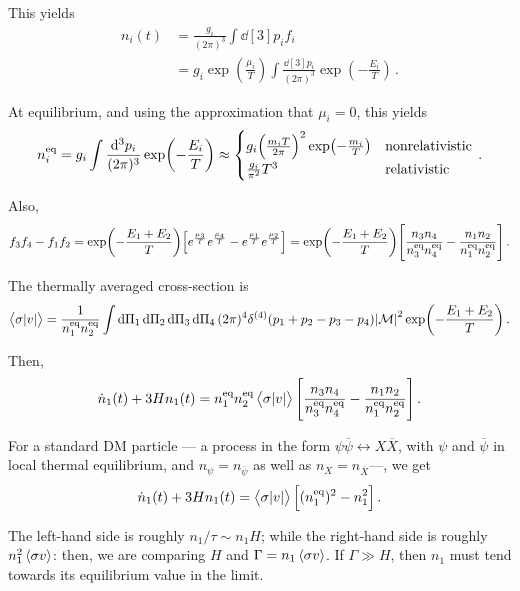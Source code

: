 \documentclass[main.tex]{subfiles}
\begin{document}
This yields 
%
\begin{align}
n_i (t) &= \frac{g_i}{(2 \pi )^3} \int \dd[3]{p_i} f_i  \\
&= g_i \exp( \frac{\mu_i}{T}) \int \frac{ \dd[3]{p_i}}{(2 \pi )^3} 
\exp(- \frac{E_i}{T})
\,.
\end{align}

At equilibrium, and using the approximation that \(\mu _i = 0\), this yields 
%
\begin{align} \label{eq:equilibrium-number-density}
n^{\text{eq}}_i = 
g_i \int \frac{ \dd[3]{p_i}}{(2 \pi )^3} 
\exp(- \frac{E_i}{T}) \approx \begin{cases}
    g_i \qty(\frac{m_i T}{2 \pi })^{2} \exp(- \frac{m_i}{T}) & \text{nonrelativistic}  \\
    \frac{g_i}{\pi^2} T^3 & \text{relativistic}
\end{cases}
\,.
\end{align}

Also, 
%
\begin{align}
f_3 f_4 - f_1 f_2 = \exp(- \frac{E_1 + E_2 }{T}) 
\qty[ e^{ \frac{\mu_3}{T}} e^{ \frac{\mu_4}{T}} - e^{ \frac{\mu_1}{T}} e^{ \frac{\mu_2}{T}} ] 
= \exp(- \frac{E_1 + E_2 }{T}) \qty[
    \frac{n_3 n_4 }{n_3^{\text{eq}} n_4^{\text{eq}}} -
    \frac{n_1 n_2 }{n_1^{\text{eq}} n_2^{\text{eq}}}
]
\,.
\end{align}

The thermally averaged cross-section is 
%
\begin{align}
\expval{\sigma \abs{v}} = 
\frac{1}{n_1^{\text{eq}} n_2^{\text{eq}}}
\int \dd{\Pi_1 }\dd{\Pi_2}\dd{\Pi_3 }\dd{\Pi_4 }
(2 \pi )^{4} \delta^{(4)} (p_1 + p_2 - p_3 - p_4 )
\abs{\mathcal{M}}^2 \exp(- \frac{E_1 + E_2 }{T})
\,.
\end{align}

Then, 
%
\begin{align}
\dot{n}_1(t) + 3 H n_1 (t) = n_1^{\text{eq}} n_2^{\text{eq}}
\expval{\sigma \abs{v}}
\qty[
    \frac{n_3 n_4 }{n_3^{\text{eq}} n_4^{\text{eq}}} -
    \frac{n_1 n_2 }{n_1^{\text{eq}} n_2^{\text{eq}}}
]
\,.
\end{align}

For a standard DM particle --- a process in the form \(\psi \overline{\psi} \leftrightarrow X \overline{X}\), with \(\psi \) and \(\overline{\psi }\) in local thermal equilibrium, and \(n_\psi = n_{\overline{\psi}}\) as well as \(n_X = n_{\overline{X}}\)---, we get 
%
\begin{align}
\dot{n}_1 (t) + 3 H n_1 (t) = \expval{\sigma \abs{v}} \qty[ (n_1^{\text{eq}})^2 - n_1^2]
\,.
\end{align}

The left-hand side is roughly \(n_1 / \tau \sim n_1 H\); while the right-hand side is roughly \(n_1^2 \expval{\sigma v}\): then, we are comparing \(H\) and \(\Gamma = n_1 \expval{\sigma v}\). 
If \(\Gamma \gg H\), then \(n_1 \) must tend towards its equilibrium value in the limit. 
\end{document}
